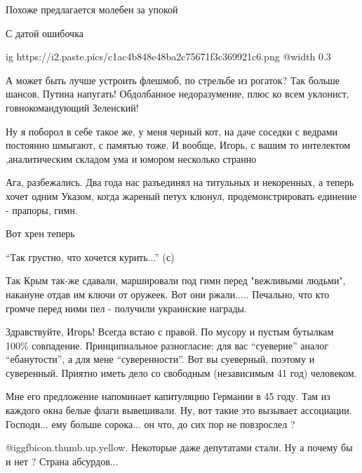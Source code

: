 \begin{itemize} %

Похоже предлагается молебен за упокой


С датой ошибочка

\ifcmt
  ig https://i2.paste.pics/c1ac4b848e48ba2c75671f3c369921c6.png
  @width 0.3
\fi


А может быть лучше устроить флешмоб, по стрельбе из рогаток? Так больше шансов,
Путина напугать! Обдолбанное недоразумение, плюс ко всем уклонист,
говнокомандующий Зеленский!


Ну я поборол в себе такое же, у меня черный кот, на даче соседки с ведрами
постоянно шмыгают, с памятью тоже. И вообще, Игорь, с вашим то интелектом
,аналитическим складом ума и юмором несколько странно


Ага, разбежались. Два года нас разъединял на титульных и некоренных, а теперь
хочет одним Указом, когда жареный петух клюнул, продемонстрировать  
единение - прапоры, гимн.

Вот хрен теперь


\enquote{Так грустно, что хочется курить...} (с)


Так Крым так-же сдавали, маршировали под гимн перед "вежливыми людьми",
накануне отдав им ключи от оружеек. Вот они ржали..... Печально, что кто громче
перед ними пел - получили украинские награды.


Здравствуйте, Игорь! Всегда встаю с правой. По мусору и пустым бутылкам 100\%
совпадение. Принципиальное разногласие: для вас \enquote{суеверие} аналог \enquote{ебанутости},
а для мене \enquote{суверенности}. Вот вы суеверный, поэтому и суверенный. Приятно
иметь дело со свободным (независимым 41 год) человеком.


Мне его предложение напоминает капитуляцию Германии в 45 году.  Там из каждого
окна белые флаги вывешивали.  Ну, вот такие это вызывает ассоциации.
Господи... ему больше сорока... он что, до сих пор не повзрослел ?


@igg{fbicon.thumb.up.yellow}.  Некоторые даже депутатами стали.  Ну а почему
бы и нет ?   Страна абсурдов...


\end{itemize}
